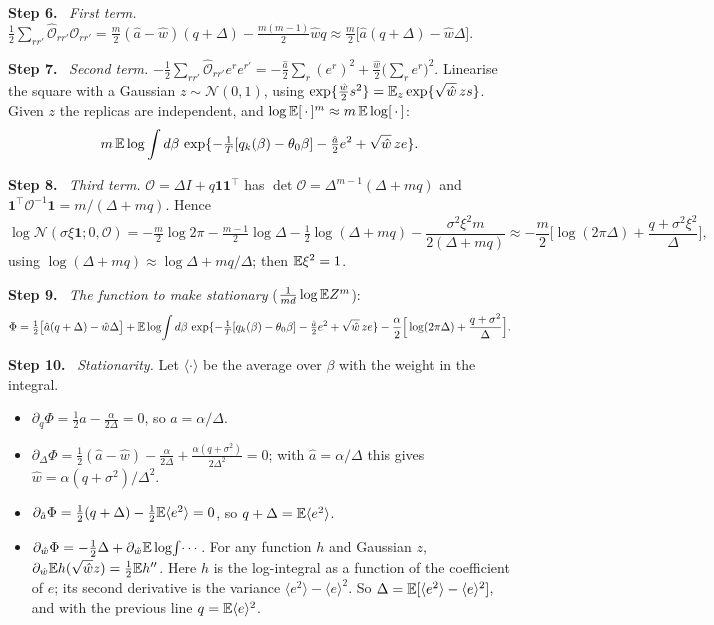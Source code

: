 \documentclass[10pt]{article}
\newcommand{\step}[1]{\par\smallskip\textbf{Step #1.}\ }
\begin{document}
\step6 \emph{First term.} $\frac12\sum_{rr'}\hat{\mathcal O}_{rr'}\mathcal O_{rr'}=\frac m2(\hat a-\hat w)(q+\Delta)-\frac{m(m-1)}2\hat wq\approx\frac m2\big[\hat a(q+\Delta)-\hat w\Delta\big]$.
\step7 \emph{Second term.} $-\frac12\sum_{rr'}\hat{\mathcal O}_{rr'}e^re^{r'}=-\frac{\hat a}2\sum_r(e^r)^2+\frac{\hat w}2\big(\sum_re^r\big)^2$. Linearise the square with a Gaussian $z\sim\mathcal N(0,1)$, using $\exp\{\frac{\hat w}2s^2\}=\mathbb E_z\exp\{\sqrt{\hat w}\,zs\}$. Given $z$ the replicas are independent, and $\log\mathbb E[\,\cdot\,]^m\approx m\,\mathbb E\log[\,\cdot\,]$:
\[
m\,\mathbb E\log\int d\beta\,\exp\{-\tfrac1T[q_k(\beta)-\theta_0\beta]-\tfrac{\hat a}2e^2+\sqrt{\hat w}\,ze\} .
\]
\step8 \emph{Third term.} $\mathcal O=\Delta I+q\mathbf 1\mathbf 1^\top$ has $\det\mathcal O=\Delta^{m-1}(\Delta+mq)$ and $\mathbf 1^\top\mathcal O^{-1}\mathbf 1=m/(\Delta+mq)$. Hence
\[
\log\mathcal N(\sigma\xi\mathbf 1;0,\mathcal O)=-\tfrac m2\log2\pi-\tfrac{m-1}2\log\Delta-\tfrac12\log(\Delta+mq)-\frac{\sigma^2\xi^2m}{2(\Delta+mq)}\approx-\frac m2\Big[\log(2\pi\Delta)+\frac{q+\sigma^2\xi^2}{\Delta}\Big],
\]
using $\log(\Delta+mq)\approx\log\Delta+mq/\Delta$; then $\mathbb E\xi^2=1$.
\step9 \emph{The function to make stationary} ($\frac1{md}\log\mathbb E Z^m$):
\[
\Phi=\tfrac12\big[\hat a(q+\Delta)-\hat w\Delta\big]+\mathbb E\log\!\int d\beta\,\exp\{-\tfrac1T[q_k(\beta)-\theta_0\beta]-\tfrac{\hat a}2e^2+\sqrt{\hat w}\,ze\}-\frac\alpha2\Big[\log(2\pi\Delta)+\frac{q+\sigma^2}{\Delta}\Big].
\]
\step{10} \emph{Stationarity.} Let $\langle\cdot\rangle$ be the average over $\beta$ with the weight in the integral.
\begin{itemize}[nosep,leftmargin=1.2em]
\item $\partial_q\Phi=\frac12\hat a-\frac\alpha{2\Delta}=0$, so $\hat a=\alpha/\Delta$.
\item $\partial_\Delta\Phi=\frac12(\hat a-\hat w)-\frac\alpha{2\Delta}+\frac{\alpha(q+\sigma^2)}{2\Delta^2}=0$; with $\hat a=\alpha/\Delta$ this gives $\hat w=\alpha(q+\sigma^2)/\Delta^2$.
\item $\partial_{\hat a}\Phi=\frac12(q+\Delta)-\frac12\mathbb E\langle e^2\rangle=0$, so $q+\Delta=\mathbb E\langle e^2\rangle$.
\item $\partial_{\hat w}\Phi=-\frac12\Delta+\partial_{\hat w}\mathbb E\log\!\int\!\cdots$. For any function $h$ and Gaussian $z$, $\partial_{\hat w}\mathbb E h(\sqrt{\hat w}z)=\frac12\mathbb E h''$. Here $h$ is the log-integral as a function of the coefficient of $e$; its second derivative is the variance $\langle e^2\rangle-\langle e\rangle^2$. So $\Delta=\mathbb E[\langle e^2\rangle-\langle e\rangle^2]$, and with the previous line $q=\mathbb E\langle e\rangle^2$.
\end{itemize}
\end{document}
